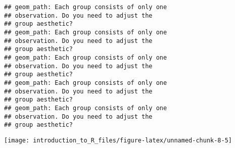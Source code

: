 \documentclass[]{tufte-handout}
\begin{document}
\begin{verbatim}
## geom_path: Each group consists of only one
## observation. Do you need to adjust the
## group aesthetic?
## geom_path: Each group consists of only one
## observation. Do you need to adjust the
## group aesthetic?
## geom_path: Each group consists of only one
## observation. Do you need to adjust the
## group aesthetic?
## geom_path: Each group consists of only one
## observation. Do you need to adjust the
## group aesthetic?
## geom_path: Each group consists of only one
## observation. Do you need to adjust the
## group aesthetic?
\end{verbatim}

\texttt{[image: introduction\_to\_R\_files/figure-latex/unnamed-chunk-8-5]}
\end{document}
